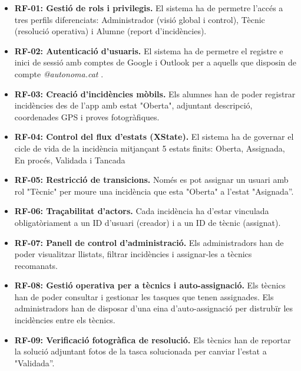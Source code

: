 \documentclass[10pt,a4paper,twocolumn,twoside]{article}
\begin{document}
		\begin{itemize}
			\item \textbf{RF-01: Gestió de rols i privilegis. }
			El sistema ha de permetre l'accés a tres perfils diferenciats: Administrador (visió global i control), Tècnic (resolució operativa) i Alumne (report d'incidències).
			
			\item \textbf{RF-02: Autenticació d'usuaris.} 
			El sistema ha de permetre el registre e inici de sessió amb comptes de Google i Outlook per a aquells que disposin de compte \textit{@autonoma.cat} . 
			
			\item \textbf{RF-03: Creació d'incidències mòbils. }
			Els alumnes han de poder registrar incidències des de l'app amb estat "Oberta", adjuntant descripció, coordenades GPS i proves fotogràfiques.
			
			\item \textbf{RF-04: Control del flux d'estats (XState).} 
			El sistema ha de governar el cicle de vida de la incidència mitjançant 5 estats finits: Oberta, Assignada, En procés, Validada i Tancada 
			
			\item \textbf{RF-05: Restricció de transicions.} 
			Només es pot assignar un usuari amb rol "Tècnic" per moure una incidència que esta "Oberta" a l'estat "Asignada”. 
			
			\item \textbf{RF-06: Traçabilitat d'actors.} 
			Cada incidència ha d'estar vinculada obligatòriament a un ID d'usuari (creador) i a un ID de tècnic (assignat). 
			
			\item \textbf{RF-07: Panell de control d'administració.} 
			Els administradors han de poder visualitzar llistats, filtrar incidències i assignar-les a tècnics recomanats.
			
			\item \textbf{RF-08: Gestió operativa per a tècnics i auto-assignació.}
			Els tècnics han de poder consultar i gestionar les tasques que tenen assignades. Els administradors han de disposar d'una eina d'auto-assignació per distrubïr les incidències entre els tècnics.
			
			\item \textbf{RF-09: Verificació fotogràfica de resolució.} 
			Els tècnics han de reportar la solució adjuntant fotos de la tasca solucionada per canviar l'estat a "Validada”. 
			

\end{itemize}
\end{document}
